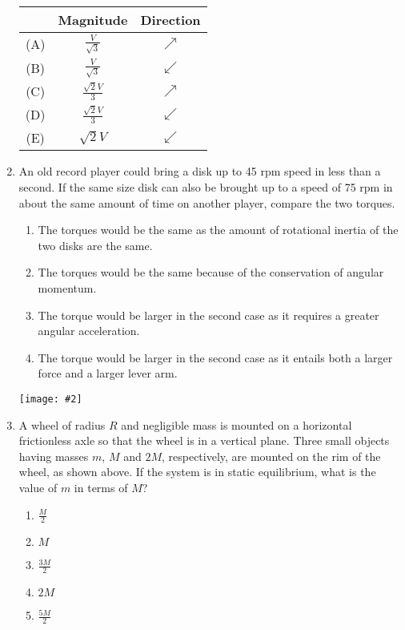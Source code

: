 \documentclass[11pt]{article}
\newcommand{\pic}[2]{\texttt{[image: \#2]}}
\begin{document}
\begin{multicols}{2}
\begin{enumerate}[leftmargin=18pt,resume]
    \begin{tabular}{ccc}
      & Magnitude & Direction \\
      \hline
      (A) & $\displaystyle\frac{V}{\sqrt{3}}$ & $\nearrow$ \\
      (B) & $\displaystyle\frac{V}{\sqrt{3}}$ & $\swarrow$ \\
      (C) & $\displaystyle\frac{\sqrt{2}V}{3}$ & $\nearrow$ \\
      (D) & $\displaystyle\frac{\sqrt{2}V}{3}$ & $\swarrow$ \\
      (E) & $\displaystyle\sqrt{2}V$ & $\swarrow$ \\
    \end{tabular}
    \vspace{.7in}
    
  \item An old record player could bring a disk up to 45 rpm speed in less than
    a second. If the same size disk can also be brought up to a speed of 75 rpm
    in about the same amount of time on another player, compare the two torques.
    \begin{enumerate}[nosep,leftmargin=18pt,label=(\Alph*)]
    \item The torques would be the same as the amount of rotational inertia of
      the two disks are the same.
    \item The torques would be the same because of the conservation of angular
      momentum.
    \item The torque would be larger in the second case as it requires a
      greater angular acceleration.
    \item The torque would be larger in the second case as it entails both a
      larger force and a larger lever arm.
    \end{enumerate}
    
    \begin{center}
      \pic{.25}{rim}
    \end{center}
  \item A wheel of radius $R$ and negligible mass is mounted on a horizontal
    frictionless axle so that the wheel is in a vertical plane. Three small
    objects having masses $m$, $M$ and $2M$, respectively, are mounted on the
    rim of the wheel, as shown above. If the system is in static equilibrium,
    what is the value of $m$ in terms of $M$?
    \begin{enumerate}[nosep,leftmargin=18pt,label=(\Alph*)]
    \item$\displaystyle\frac{M}{2}$
    \item$M$
    \item$\displaystyle\frac{3M}{2}$
    \item$2M$
    \item$\displaystyle\frac{5M}{2}$
    \end{enumerate}


\end{enumerate}
\end{multicols}
\end{document}
